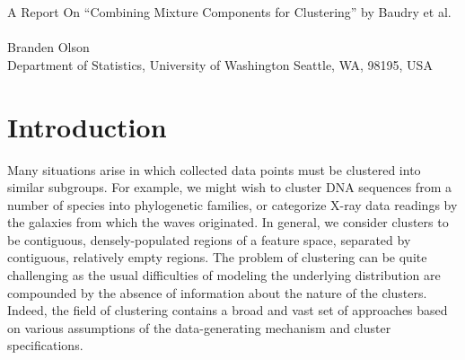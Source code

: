\documentclass{uwstat572}
\renewcommand\;{\,}
\begin{document}

\begin{center}
  {\LARGE A Report On ``Combining Mixture Components for Clustering'' by Baudry et al.}\\\ \\
  {Branden Olson\\ 
    Department of Statistics, University of Washington Seattle, WA, 98195, USA
  }
\end{center}



\begin{abstract}
Model-based clustering assumes an underlying Gaussian mixture model, but often the number of mixture components is unknown. 
The BIC criterion, commonly used in model selection, excels at inferring the number of components, but frequently overestimates the number of clusters. 
An extension known as the ICL criterion, which penalizes model entropy, assuages this to yield a more accurate cluster count, although falls flat for non-Gaussian cluster distributions. 
\citet{Baudry10} propose a method with combines the strengths of the two approaches, yielding a sequence of clusterings starting from the BIC solution, and iteratively merging clusters to minimize the resultant entropy.
This method is applied to simulated and real data, demonstrating superior performance in each case.
\end{abstract}

\section{Introduction}

Many situations arise in which collected data points must be clustered into similar subgroups. 
For example, we might wish to cluster DNA sequences from a number of species into phylogenetic families, or categorize X-ray data readings by the galaxies from which the waves originated.
In general, we consider clusters to be contiguous, densely-populated regions of a feature space, separated by contiguous, relatively empty regions.
The problem of clustering can be quite challenging as the usual difficulties of modeling the underlying distribution are compounded by the absence of information about the nature of the clusters.
Indeed, the field of clustering contains a broad and vast set of approaches based on various assumptions of the data-generating mechanism and cluster specifications.
\end{document}
